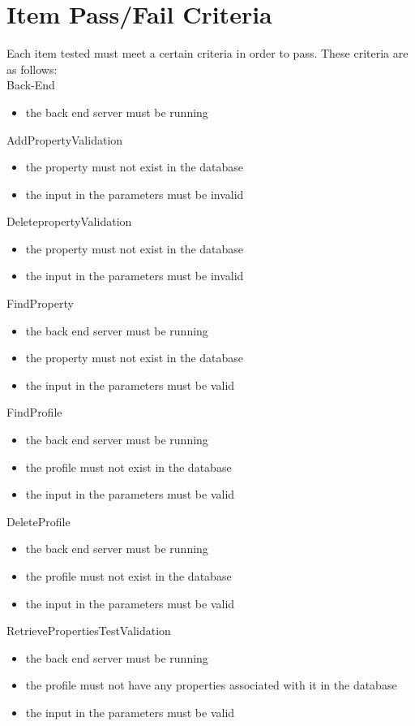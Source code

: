 \documentclass[a4paper,12pt]{article}
\begin{document}
\section{Item Pass/Fail Criteria}
Each item tested must meet a certain criteria in order to pass. These criteria are as follows:\\
Back-End
\begin{itemize}
 \item the back end server must be running
\end{itemize}
AddPropertyValidation
\begin{itemize}
 \item the property must not exist in the database
 \item the input in the parameters must be invalid
\end{itemize}
DeletepropertyValidation
\begin{itemize}
 \item the property must not exist in the database
 \item the input in the parameters must be invalid
\end{itemize}
FindProperty
\begin{itemize}
 \item the back end server must be running
 \item the property must not exist in the database
 \item the input in the parameters must be valid
\end{itemize}
FindProfile
\begin{itemize}
 \item the back end server must be running
 \item the profile must not exist in the database
 \item the input in the parameters must be valid
\end{itemize}
DeleteProfile
\begin{itemize}
 \item the back end server must be running
 \item the profile must not exist in the database
 \item the input in the parameters must be valid
\end{itemize}
RetrievePropertiesTestValidation
\begin{itemize}
 \item the back end server must be running
 \item the profile must not have any properties associated with it in the database
 \item the input in the parameters must be valid
\end{itemize}
\end{document}
